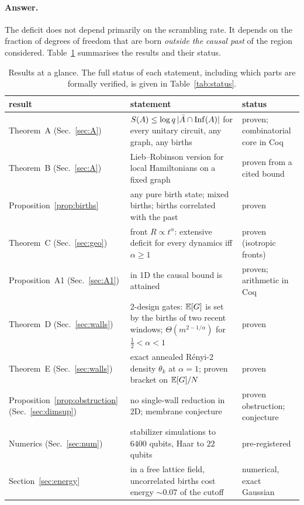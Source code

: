 \paragraph{Answer.} The deficit does not depend primarily on the scrambling rate. It depends on the fraction of degrees of freedom that are born \emph{outside the causal past} of the region considered. Table~\ref{tab:glance} summarises the results and their status.

\begin{table}[h]
\centering\small\setlength{\tabcolsep}{4pt}
\begin{tabular}{p{3.2cm}p{8.3cm}p{2.9cm}}
\toprule
result & statement & status\\
\midrule
Theorem~A (Sec.~\ref{sec:A}) & $S(A)\le\log q\,|\bar A\cap\mathrm{Inf}(A)|$ for every unitary circuit, any graph, any births & proven; combinatorial core in Coq\\
Theorem~B (Sec.~\ref{sec:A}) & Lieb--Robinson version for local Hamiltonians on a fixed graph & proven from a cited bound\\
Proposition~\ref{prop:births} & any pure birth state; mixed births; births correlated with the past & proven\\
Theorem~C (Sec.~\ref{sec:geo}) & front $R\propto t^\alpha$: extensive deficit for every dynamics iff $\alpha\ge1$ & proven (isotropic fronts)\\
Proposition~A1 (Sec.~\ref{sec:A1}) & in 1D the causal bound is attained & proven; arithmetic in Coq\\
Theorem~D (Sec.~\ref{sec:walls}) & 2-design gates: $\mathbb{E}[G]$ is set by the births of two recent windows; $\Theta(m^{2-1/\alpha})$ for $\frac12<\alpha<1$ & proven\\
Theorem~E (Sec.~\ref{sec:walls}) & exact annealed Rényi-2 density $\theta_k$ at $\alpha=1$; proven bracket on $\mathbb{E}[G]/N$ & proven\\
Proposition~\ref{prop:obstruction} (Sec.~\ref{sec:dimsup}) & no single-wall reduction in 2D; membrane conjecture & proven obstruction; conjecture\\
Numerics (Sec.~\ref{sec:num}) & stabilizer simulations to $6400$ qubits, Haar to $22$ qubits & pre-registered\\
Section~\ref{sec:energy} & in a free lattice field, uncorrelated births cost energy $\sim0.07$ of the cutoff & numerical, exact Gaussian\\
\bottomrule
\end{tabular}
\caption{Results at a glance. The full status of each statement, including which parts are formally verified, is given in Table~\ref{tab:status}.}
\label{tab:glance}
\end{table}

